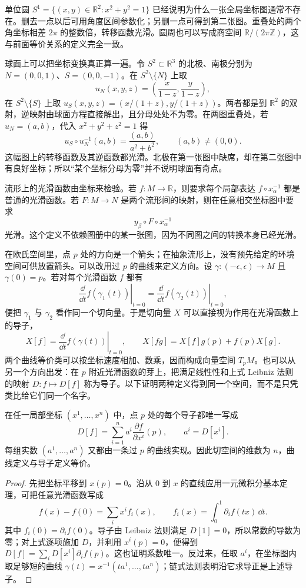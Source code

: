 单位圆 \(S^1=\{(x,y)\in\mathbb R^2:x^2+y^2=1\}\) 已经说明为什么一张全局坐标图通常不存在。删去一点以后可用角度区间参数化；另删一点可得到第二张图。重叠处的两个角坐标相差 \(2\pi\) 的整数倍，转移函数光滑。圆周也可以写成商空间 \(\mathbb R/(2\pi\mathbb Z)\)，这与前面等价关系的定义完全一致。

球面上可以把坐标变换真正算一遍。令 $S^2\subset\mathbb R^3$ 的北极、南极分别为 $N=(0,0,1)$、$S=(0,0,-1)$。在 $S^2\setminus\{N\}$ 上取
\[
u_N(x,y,z)=\left(\frac{x}{1-z},\frac{y}{1-z}\right),
\]
在 $S^2\setminus\{S\}$ 上取 $u_S(x,y,z)=(x/(1+z),y/(1+z))$。两者都是到 $\mathbb R^2$ 的双射，逆映射由球面方程直接解出，且分母处处不为零。在两图重叠处，若 $u_N=(a,b)$，代入 $x^2+y^2+z^2=1$ 得
\[
u_S\circ u_N^{-1}(a,b)
=\frac{(a,b)}{a^2+b^2},\qquad (a,b)\ne(0,0).
\]
这幅图上的转移函数及其逆函数都光滑。北极在第一张图中缺席，却在第二张图中有良好坐标；所以“某个坐标分母为零”并不说明球面有奇点。

流形上的光滑函数由坐标来检验。若 \(f:M\to\mathbb R\)，则要求每个局部表达
\(f\circ x_\alpha^{-1}\) 都是普通的光滑函数。若 \(F:M\to N\) 是两个流形间的映射，则在任意相交坐标图中要求
\[
y_\beta\circ F\circ x_\alpha^{-1}
\]
光滑。这个定义不依赖图册中的某一张图，因为不同图之间的转换本身已经光滑。

在欧氏空间里，点 \(p\) 处的方向是一个箭头；在抽象流形上，没有预先给定的环境空间可供放置箭头。可以改用过 \(p\) 的曲线来定义方向。设 \(\gamma:(-\epsilon,\epsilon)\to M\) 且 \(\gamma(0)=p\)。若对每个光滑函数 \(f\) 都有
\[
\left.\frac{\dd}{\dd t}f(\gamma_1(t))\right|_{t=0}
=
\left.\frac{\dd}{\dd t}f(\gamma_2(t))\right|_{t=0},
\]
便把 \(\gamma_1\) 与 \(\gamma_2\) 看作同一个切向量。于是切向量 \(X\) 可以直接视为作用在光滑函数上的导子，
\[
X[f]=\left.\frac{\dd}{\dd t}f(\gamma(t))\right|_{t=0},
\qquad
X[fg]=X[f]g(p)+f(p)X[g].
\]
两个曲线等价类可以按坐标速度相加、数乘，因而构成向量空间 $T_pM$。也可以从另一个方向出发：在 $p$ 附近光滑函数的芽上，把满足线性性和上式 Leibniz 法则的映射 $D:f\mapsto D[f]$ 称为导子。以下证明两种定义得到同一个空间，而不是只凭类比给它们同一个名字。

\begin{proposition}[切向量的坐标刻画]
在任一局部坐标 $(x^1,\ldots,x^n)$ 中，点 $p$ 处的每个导子都唯一写成
\[
D[f]=\sum_{i=1}^n a^i\frac{\partial f}{\partial x^i}(p),
\qquad a^i=D[x^i].
\]
每组实数 $(a^1,\ldots,a^n)$ 又都由一条过 $p$ 的曲线实现。因此切空间的维数为 $n$，曲线定义与导子定义等价。
\end{proposition}

\begin{proof}
先把坐标平移到 $x(p)=0$。沿从 $0$ 到 $x$ 的直线应用一元微积分基本定理，可把任意光滑函数写成
\[
f(x)-f(0)=\sum_i x^i f_i(x),\qquad
f_i(x)=\int_0^1\partial_i f(tx)\,\dd t.
\]
其中 $f_i(0)=\partial_i f(0)$。导子由 Leibniz 法则满足 $D[1]=0$，所以常数的导数为零；对上式逐项施加 $D$，并利用 $x^i(p)=0$，便得到 $D[f]=\sum_iD[x^i]\partial_i f(p)$。这也证明系数唯一。反过来，任取 $a^i$，在坐标图内取足够短的曲线 $\gamma(t)=x^{-1}(ta^1,\ldots,ta^n)$；链式法则表明沿它求导正是上述导子。
\end{proof}

